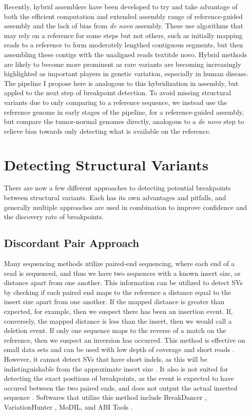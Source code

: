 \documentclass{easychithesis}
\begin{document}
Recently, hybrid assemblers have been developed to try and take advantage of both the efficient computation and extended assembly range of reference-guided assembly and the lack of bias from \textit{de novo} assembly. These use algorithms that may rely on a reference for some steps but not others, such as initially mapping reads to a reference to form moderately lengthed contiguous segments, but then assembling these contigs with the unaligned reads textit{de novo}. Hybrid methods are likely to become more prominent as rare variants are becoming increasingly highlighted as important players in genetic variation, especially in human disease. The pipeline I propose here is analogous to this hybridization in assembly, but appled to the next step of breakpoint detection. To avoid missing structural variants due to only comparing to a reference sequence, we instead use the reference genome in early stages of the pipeline, for a reference-guided assembly, but compare the tumor-normal genomes directly, analogous to a \textit{de novo} step to relieve bias towards only detecting what is available on the reference.



\section{Detecting Structural Variants}
There are now a few different approaches to detecting potential breakpoints between structural variants. Each has its own advantages and pitfalls, and generally multiple approaches are used in combination to improve confidence and the discovery rate of breakpoints.

\subsection{Discordant Pair Approach}
Many sequencing methods utilize paired-end sequencing, where each end of a read is sequenced, and thus we have two sequences with a known insert size, or distance apart from one another. This information can be utilized to detect SVs by checking if each paired end maps to the reference a distance equal to the insert size apart from one another. If the mapped distance is greater than expected, for example, then we suspect there has been an insertion event. If, conversely, the mapped distance is less than the insert, then we would call a deletion event. If only one sequence maps to the reverse of a match on the reference, then we suspect an inversion has occurred. This method is effective on small data sets and can be used with low depth of coverage and short reads \cite{suzuki2011clipcrop}. However, it cannot detect SVs that have short indels, as this will be indistinguishable from the approximate insert size \cite{abel2013detection, pabinger2014survey}. It also is not suited for detecting the exact positions of breakpoints, as the event is expected to have occured between the two paired ends, and does not output the actual inserted sequence \cite{abel2013detection}. Softwares that utilize this method include BreakDancer \cite{chen2009breakdancer}, VariationHunter \cite{hormozdiari2010next}, MoDIL, and ABI Tools \cite{suzuki2011clipcrop}.
\end{document}

